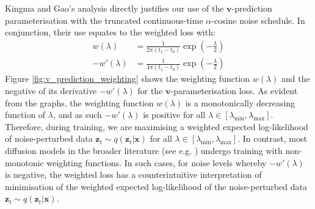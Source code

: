 \documentclass[ oneside,%
                    author={George Herbert},
                    degree={MSci},
                     title={Diffusion Models for Time-Evolving Precipitation Fields},
                  subtitle={}]{dissertation}
\begin{document}
Kingma and Gao's \cite{Understanding_Diffusion_Objective_Kingma} analysis directly justifies our use of the $\mathbf{v}$-prediction parameterisation with the truncated continuous-time $\alpha$-cosine noise schedule. In conjunction, their use equates to the weighted loss with:
\begin{align}
      w(\lambda)&=\frac{1}{2\pi(t_1-t_0)}\exp\left(-\frac{\lambda}{2}\right)\\
      -w'(\lambda)&=\frac{1}{4\pi(t_1-t_0)}\exp\left(-\frac{\lambda}{2}\right)
\end{align}
Figure \ref{fig:v_prediction_weighting} shows the weighting function $w(\lambda)$ and the negative of its derivative $-w'(\lambda)$ for the $\mathbf{v}$-parameterisation loss. As evident from the graphs, the weighting function $w(\lambda)$ is a monotonically decreasing function of $\lambda$, and as such $-w'(\lambda)$ is positive for all $\lambda\in [\lambda_{\min}, \lambda_{\max}]$. Therefore, during training, we are maximising a weighted expected log-likelihood of noise-perturbed data $\mathbf{z}_t\sim q(\mathbf{z}_t|\mathbf{x})$ for all $\lambda\in[\lambda_{\min}, \lambda_{\max}]$. In contrast, most diffusion models in the broader literature (see e.g. \cite{DDPM_Ho,IDDPM_Nichol,Imagen_Saharia}) undergo training with non-monotonic weighting functions. In such cases, for noise levels whereby $-w'(\lambda)$ is negative, the weighted loss has a counterintuitive interpretation of minimisation of the weighted expected log-likelihood of the noise-perturbed data $\mathbf{z}_t\sim q(\mathbf{z}_t|\mathbf{x})$.
\end{document}
